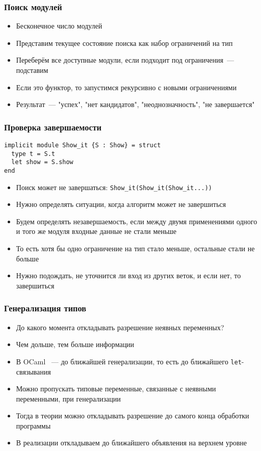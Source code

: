 \documentclass{beamer}
\begin{document}
\begin{frame}\frametitle{Поиск модулей}
\begin{itemize}
  \item Бесконечное число модулей
  \item Представим текущее состояние поиска как набор ограничений на тип
  \item Переберём все доступные модули, если подходит под ограничения~--- подставим
  \item Если это функтор, то запустимся рекурсивно с новыми ограничениями
  \item Результат~--- "успех", "нет кандидатов", "неоднозначность", "не завершается"
\end{itemize}
\end{frame}

\lstset{language=caml}
\begin{frame}[fragile]\frametitle{Проверка завершаемости}
\begin{lstlisting}
implicit module Show_it {S : Show} = struct
  type t = S.t
  let show = S.show
end
\end{lstlisting}
\begin{itemize}
  \item Поиск может не завершаться: \texttt{Show\_it(Show\_it(Show\_it...))}
  \item Нужно определять ситуации, когда алгоритм может не завершиться
  \item Будем определять незавершаемость, если между двумя применениями одного и того же модуля входные данные не стали меньше
  \item То есть хотя бы одно ограничение на тип стало меньше, остальные стали не больше
  \item Нужно подождать, не уточнится ли вход из других веток, и если нет, то завершиться
\end{itemize}
\end{frame}

\begin{frame}\frametitle{Генерализация типов}
\begin{itemize}
  \item До какого момента откладывать разрешение неявных переменных?
  \item Чем дольше, тем больше информации
  \item В OCaml ~--- до ближайшей генерализации, то есть до ближайшего \texttt{let}-связывания
  \item Можно пропускать типовые переменные, связанные с неявными переменными, при генерализации
  \item Тогда в теории можно откладывать разрешение до самого конца обработки программы
  \item В реализации откладываем до ближайшего объявления на верхнем уровне
\end{itemize}
\end{frame}
\end{document}
